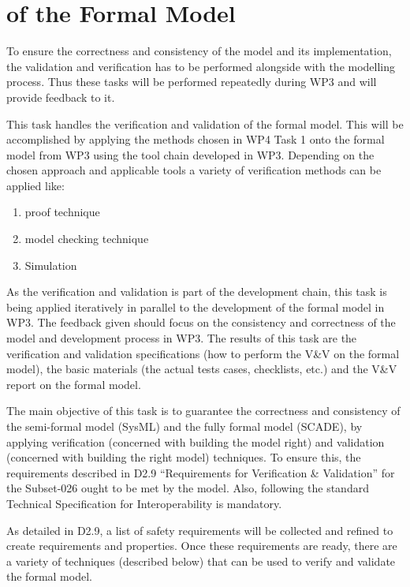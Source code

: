 \section{\VV of the Formal Model}
\tbc

To ensure the correctness and consistency of the model and its implementation, the validation and verification has to be performed alongside with the modelling process. Thus these tasks will be performed repeatedly during WP3 and will provide feedback to it.

This task handles the verification and validation of the formal model. This will be accomplished by applying the methods chosen in WP4 Task 1 onto the formal model from WP3 using the tool chain developed in WP3. Depending on the chosen approach and applicable tools a variety of verification methods can be applied like:
\begin{enumerate}
\item proof technique
\item model checking technique
\item Simulation
\end{enumerate}
As the verification and validation is part of the development chain, this task is being applied iteratively in parallel to the development of the formal model in WP3. The feedback given should focus on the consistency and correctness of the model and development process in WP3.
The results of this task are the verification and validation specifications (how to perform the V\&V on the formal model), the basic materials (the actual tests cases, checklists, etc.) and the V\&V report on the formal model.

The main objective of this task is to guarantee the correctness and consistency of the semi-formal model (SysML) and the fully formal model (SCADE), by applying verification (concerned with building the model right) and validation (concerned with building the right model) techniques. To ensure this, the requirements described in D2.9 “Requirements for Verification \& Validation” for the Subset-026 ought to be met by the model. Also, following the standard Technical Specification for Interoperability is mandatory.

As detailed in D2.9, a list of safety requirements will be collected and refined to create requirements and properties. Once these requirements are ready, there are a variety of techniques (described below) that can be used to verify and validate the formal model. 


